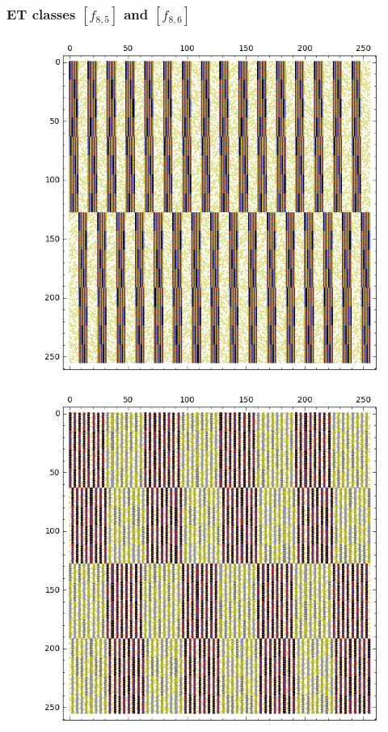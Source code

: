 \documentclass[pdf,sprung,slideColor,nocolorBG]{beamer}
\newenvironment{colortheme}[1]{
\def\ProvidesPackageRCS $##1${\relax}
\renewcommand{\ProcessOptions}{\relax}
\makeatletter

\makeatother
}{}
\begin{document}
\begin{colortheme}{jubata}
\begin{frame}
\begin{figure}
\begin{minipage}{.48\textwidth}
  \label{fig:8_6_bent_cayley_graph_index_matrix}
\end{minipage}
\end{figure}
\end{frame}

\begin{frame}
\frametitle{ET classes  $[f_{8,5}]$ and $[f_{8,6}]$}
\begin{figure}
\centering
\begin{minipage}{.48\textwidth}
  \centering
  \includegraphics[width=.9\linewidth]{../matrix_plot/re8_5_bent_cayley_graph_index_matrix.png}
  \label{fig:re8_5_bent_cayley_graph_index_matrix}
\end{minipage}%
\begin{minipage}{.48\textwidth}
  \centering
  \includegraphics[width=.9\linewidth]{../matrix_plot/re8_6_bent_cayley_graph_index_matrix.png}

\end{minipage}
\end{figure}
\end{frame}
\end{colortheme}
\end{document}
